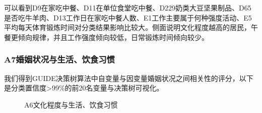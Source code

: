 \documentclass{article}
\numberwithin{equation}{subsection}
\begin{document}
可以看到D9在家吃中餐、D11在单位食堂吃中餐、D229奶类大豆坚果制品、D65是否吃牛羊肉、D13工作日在家吃中餐人数、E1工作主要属于何种强度活动、E5平均每天体育锻炼时间对分类结果影响比较大。侧面说明文化程度越高的居民，午餐更倾向规律，并且工作强度倾向较低，日常锻炼时间倾向较少。
\subsubsection{A7婚姻状况与生活、饮食习惯}
我们得到GUIDE决策树算法中自变量与因变量婚姻状况之间相关性的评分，以下是分类置信度>99\%的前20名变量与决策树可视化。
\begin{figure}[htbp]
    \centering
    \quad
    \caption{A6文化程度与生活、饮食习惯}
\end{figure}
\end{document}
